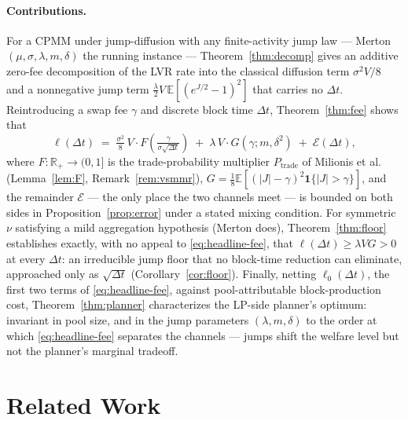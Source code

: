 \documentclass[runningheads]{llncs}
\newcommand{\E}{\mathbb{E}}
\newcommand{\R}{\mathbb{R}}
\newcommand{\dt}{\Delta t}
\newcommand{\1}{\mathbf{1}}
\begin{document}
\paragraph{Contributions.} For a CPMM under jump-diffusion with any finite-activity jump law --- Merton $(\mu,\sigma,\lambda,m,\delta)$ the running instance --- Theorem~\ref{thm:decomp} gives an additive zero-fee decomposition of the LVR rate into the classical diffusion term $\sigma^2 V/8$ and a nonnegative jump term $\tfrac{\lambda}{2}V\,\E[(e^{J/2}-1)^2]$ that carries no $\dt$. Reintroducing a swap fee $\gamma$ and discrete block time $\dt$, Theorem~\ref{thm:fee} shows that
\begin{equation}\label{eq:headline-fee}
\ell(\dt) \;=\; \tfrac{\sigma^2}{8}\,V \cdot F\!\left(\tfrac{\gamma}{\sigma\sqrt{\dt}}\right) \;+\; \lambda\,V \cdot G(\gamma; m, \delta^2) \;+\; \mathcal{E}(\dt),
\end{equation}
where $F:\R_+\to(0,1]$ is the trade-probability multiplier $P_{\mathrm{trade}}$ of Milionis et al.~\cite{milionis2023automated} (Lemma~\ref{lem:F}, Remark~\ref{rem:vsmmr}), $G = \tfrac{1}{8}\E[(|J|-\gamma)^2\1\{|J|>\gamma\}]$, and the remainder $\mathcal{E}$ --- the only place the two channels meet --- is bounded on both sides in Proposition~\ref{prop:error} under a stated mixing condition. For symmetric $\nu$ satisfying a mild aggregation hypothesis (Merton does), Theorem~\ref{thm:floor} establishes exactly, with no appeal to \eqref{eq:headline-fee}, that $\ell(\dt) \ge \lambda V G > 0$ at every $\dt$: an irreducible jump floor that no block-time reduction can eliminate, approached only as $\sqrt{\dt}$ (Corollary~\ref{cor:floor}). Finally, netting $\ell_0(\dt)$, the first two terms of \eqref{eq:headline-fee}, against pool-attributable block-production cost, Theorem~\ref{thm:planner} characterizes the LP-side planner's optimum: invariant in pool size, and in the jump parameters $(\lambda,m,\delta)$ to the order at which \eqref{eq:headline-fee} separates the channels --- jumps shift the welfare level but not the planner's marginal tradeoff.


\section{Related Work}\label{sec:related}
\end{document}

